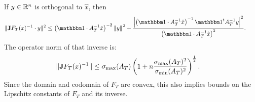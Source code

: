 \documentclass[10pt,a4paper]{article}
\begin{document}
\begin{itemize}
        If $y \in {\mathbb R}^{n}$ is orthogonal to $\hat x$, then 
        \begin{align*}
            \| \Jacobian F_T(x)^{-1} \cdot y \|^{2}
            &\leq 
            \left( \vecone \cdot A_{T}^{-1} \hat x \right)^{-2}
            \left\| 
                y
            \right\|^{2}
            +
            \frac{ 
            \left| 
                \left( \vecone \cdot A_{T}^{-1} \hat x \right)^{-1}
                \vecone^{t} A_{T}^{-1} y 
            \right|^{2}
            }{
            \left( \vecone \cdot A_{T}^{-1} \hat x \right)^{2}
            }
            .
        \end{align*}
        The operator norm of that inverse is:
        \begin{align*}
            \| {\mathbf{J}} F_T(x)^{-1} \|
            \leq 
            \sigma_{\max}( A_{T} )
            \left( 1 + n \frac{ \sigma_{\max}(A_{T})^{2} }{ \sigma_{\min}(A_{T})^{2} } \right)^{\frac 1 2}
            .
        \end{align*}
        Since the domain and codomain of $F_{T}$ are convex, 
        this also implies bounds on the Lipschitz constants of $F_{T}$ and its inverse. 












\end{itemize}
\end{document}
